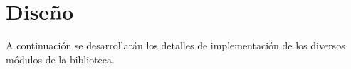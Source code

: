 \chapter{Diseño}
A continuación se desarrollarán los detalles de implementación de los diversos módulos de la biblioteca.




